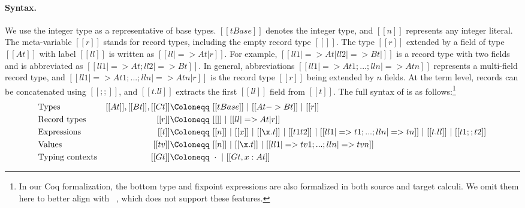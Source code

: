 \paragraph{Syntax.}
We use the integer type as a representative of base types. $[[tBase]]$ denotes
the integer type, and $[[n]]$ represents any integer literal. The meta-variable
$[[r]]$ stands for record types, including the empty record type $[[{}]]$. The
type $[[r]]$ extended by a field of type $[[At]]$ with label $[[ll]]$ is written
as $[[{ll |=>At | r}]]$. For example, $[[{ll1 |=>At | {ll2|=>Bt | {}}}]]$ is a
record type with two fields and is abbreviated as $[[ {ll1 |=>At; ll2|=>Bt} ]]$.
In general, abbreviations $[[ { ll1 |=>At1 ; ... ; lln |=>Atn } ]]$ represents a
multi-field record type, and $[[ { ll1 |=> At1 ; ... ; lln |=> Atn | r } ]]$ is
the record type $[[r]]$ being extended by $n$ fields. At the term level, records
can be concatenated using $[[;;]]$, and $[[t.ll ]]$ extracts the first $[[ll]]$
field from $[[t]]$. The full syntax of \lambdar is as follows:\footnote{In our
Coq formalization, the bottom type and fixpoint expressions are also formalized
in both source and target calculi. We omit them here to better align with
\lambdaiplus~\citep{bi2018essence}, which does not support these features.}
{ \small
    \begin{align*}
      &\text{Types}        &[[At]], [[Bt]], [[Ct]] \Coloneqq&~ [[tBase]] ~|~ [[At -> Bt]] ~|~ [[r]]  \\
      &\text{Record types} &[[r]]  \Coloneqq&~ [[{}]] ~|~ [[{ll |=> At | r}]]  \\
      &\text{Expressions}  &[[t]]  \Coloneqq&~ [[n]] ~|~ [[x]] ~|~
                                              [[\x.t]] ~|~ [[t1 t2]]
                                              ~|~[[ { ll1 |=> t1 ;
                                                    ... ; lln |=> tn } ]] ~|~ [[t.ll ]]~|~ [[t1;;t2]] \\
      &\text{Values}       &[[tv]] \Coloneqq&~ [[n]] ~|~ [[\x.t]] ~|~ [[ { ll1 |=> tv1 ; ... ; lln |=> tvn } ]] \\
      &\text{Typing contexts} &[[Gt]] \Coloneqq&~  \cdot ~|~ [[ Gt, x:At ]] %
    \end{align*}
}

